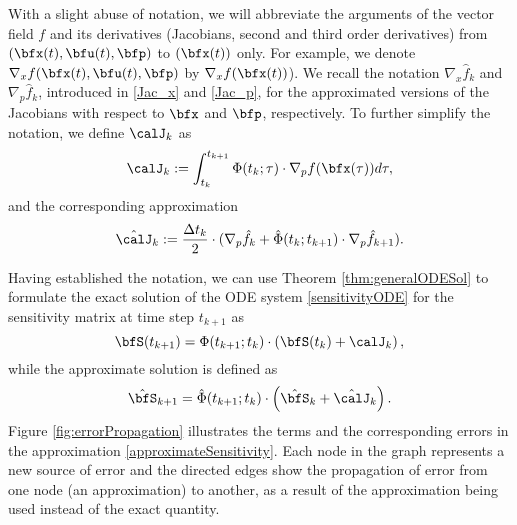 \documentclass[DIV=12]{scrartcl} %
\theoremstyle{definition}
\begin{document}
With a slight abuse of notation, we will abbreviate the arguments of the vector field $f$ and its derivatives (Jacobians, second and third order derivatives) from $(\bfx(t),\bfu(t),\bfp)$ to $(\bfx(t))$ only. For example, we denote $\nabla_xf(\bfx(t),\bfu(t),\bfp)$ by $\nabla_xf(\bfx(t))$). We recall the notation $\nabla_x\hat{f}_k$ and $\nabla_p\hat{f}_k$, introduced in \eqref{Jac_x} and \eqref{Jac_p}, for the approximated versions of the Jacobians with respect to $\bfx$ and $\bfp$, respectively. To further simplify the notation, we define $\calJ _k$ as
\[
    \calJ_k:=\int_{t_k}^{t_{k+1}}\Phi(t_k;\tau)\cdot \nabla_pf(\bfx(\tau))d\tau,
\]
and the corresponding approximation
\[
\hat{\calJ}_k:=\frac{\Delta t_k}{2}\cdot(\nabla_p\hat{f}_k+\hat{\Phi}(t_{k};t_{k+1})\cdot\nabla_p\hat{f}_{k+1}).
\]

Having established the notation, we can use Theorem \ref{thm:generalODESol} to formulate the exact solution of the ODE system \eqref{sensitivityODE} for the sensitivity matrix at time step $t_{k+1}$ as
\begin{equation}
    \label{exactSensitivity}
    \bfS(t_{k+1}) = \Phi(t_{k+1};t_k)\cdot\left(\bfS(t_k)+\calJ_k\right),
\end{equation}
while the approximate solution is defined as 
\begin{equation}
\label{approximateSensitivity}
\hat{\bfS}_{k+1} = \hat{\Phi}(t_{k+1};t_k)\cdot\left(\hat{\bfS}_k+\hat{\calJ}_k\right).
\end{equation}
Figure \ref{fig:errorPropagation} illustrates the terms and the corresponding errors in the approximation \eqref{approximateSensitivity}. Each node in the graph represents a new source of error and the directed edges show the propagation of error from one node (an approximation) to another, as a result of the approximation being used instead of the exact quantity.
\end{document}
